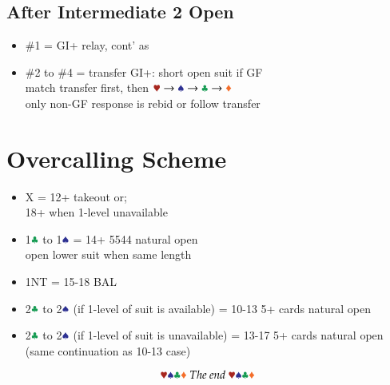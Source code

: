 \documentclass{article}
\begin{document}
\begin{multicols}{2}
\subsection{After Intermediate 2 Open}\label{sec:intermediate-2}
\begin{itemize}
    \item \#1 = GI+ relay, cont' as 
    \item \#2 to \#4 = transfer GI+: short open suit if GF \\
        match transfer first, then $\hscd$ \\
        only non-GF response is rebid or follow transfer
        
\end{itemize}

\section{Overcalling Scheme}
\begin{itemize}
    \item X = 12+ takeout or; \\
        18+ when 1-level unavailable
    \item 1$\ccc$ to 1$\sss$ = 14+ 5544 natural open \\
        open lower suit when same length
    \item 1NT = 15-18 BAL
    \item 2$\ccc$ to 2$\sss$ (if 1-level of suit is available) = 10-13 5+ cards natural open
    \item 2$\ccc$ to 2$\sss$ (if 1-level of suit is unavailable) = 13-17 5+ cards natural open (same continuation as 10-13 case)
\end{itemize}

\columnbreak
$$\hhh\sss\ccc\ddd~The~end~\hhh\sss\ccc\ddd$$

\end{multicols}
\end{document}
